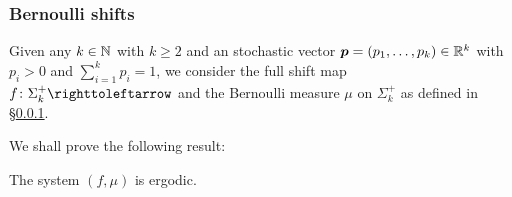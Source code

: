 \subsubsection{Bernoulli shifts}\label{sec:Bernoulli-shifts}

Given any $k\in\mathbb{N}$ with $k\geq 2$ and an stochastic vector $\boldsymbol{p}=(p_1,\ldots,p_k)\in\mathbb{R}^k$ with $p_i>0$ and $\sum_{i=1}^{k}p_i=1$, we consider the full shift map $f\colon\Sigma_k^+\carr$ and the Bernoulli measure $\mu$ on $\Sigma_k^+$ as defined in \S\ref{sec:Bernoulli-shifts}.

We shall prove the following result:

\begin{theorem}
  \label{thm:Bernoulli-shifts-ergodicity}
  The system $(f,\mu)$ is ergodic.
\end{theorem}

